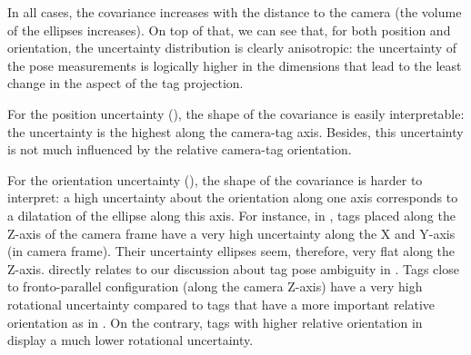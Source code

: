 In all cases, the covariance increases with the distance to the camera (the volume of the ellipses increases).
On top of that, we can see that, for both position and orientation, the uncertainty distribution is clearly anisotropic: 
the uncertainty of the pose measurements is logically higher in the dimensions that lead to the least change in the aspect of the tag projection. 

For the position uncertainty (), the shape of the covariance is easily interpretable: the uncertainty is the highest along the camera-tag axis.
Besides, this uncertainty is not much influenced by the relative camera-tag orientation. 

For the orientation uncertainty (), the shape of the covariance is harder to interpret: a high uncertainty about the orientation along 
one axis corresponds to a dilatation of the ellipse along this axis. For instance, in , tags placed
along the Z-axis of the camera frame have a very high uncertainty along the X and Y-axis (in camera frame). Their uncertainty ellipses seem, therefore, very flat
along the Z-axis.  directly relates to our discussion about tag pose ambiguity in . Tags close
to fronto-parallel configuration (along the camera Z-axis) have a very high rotational uncertainty compared to tags that have a more important relative 
orientation as in . On the contrary, tags with higher relative orientation in  display a much lower rotational uncertainty.



